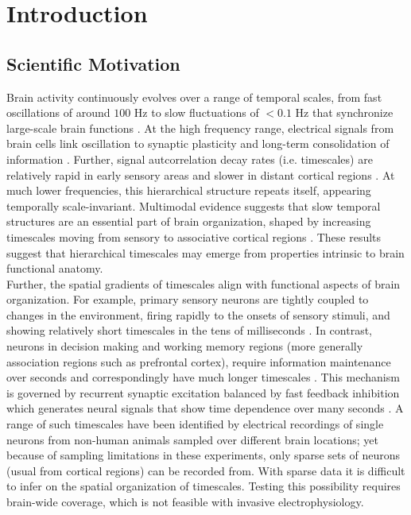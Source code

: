 \documentclass[latex/main.tex]{subfiles}
\begin{document}
\section{Introduction}

\subsection{Scientific Motivation} 

Brain activity continuously evolves over a range of temporal scales, from fast oscillations of around $100$ Hz to slow fluctuations of $<0.1$ Hz that synchronize large-scale brain functions \cite{buzsaki_neuronal_2004}. At the high frequency range, electrical signals from brain cells link oscillation to synaptic plasticity and long-term consolidation of information \cite{buzsaki_neuronal_2004}. Further, signal autcorrelation decay rates (i.e. timescales) are relatively rapid in early sensory areas and slower in distant cortical regions \cite{murray_hierarchy_2014, gao_neuronal_2020}. At much lower frequencies, this hierarchical structure repeats itself, appearing temporally scale-invariant. Multimodal evidence suggests that slow temporal structures are an essential part of brain organization, shaped by increasing timescales moving from sensory to associative cortical regions \cite{raut_hierarchical_2020, gao_neuronal_2020, hasson_hierarchy_2008}. These results suggest that hierarchical timescales may emerge from properties intrinsic to brain functional anatomy.\\

Further, the spatial gradients of timescales align with functional aspects of brain organization. For example, primary sensory neurons are tightly coupled to changes in the environment, firing rapidly to the onsets of sensory stimuli, and showing relatively short timescales in the tens of milliseconds \cite{runyan_distinct_2017}. In contrast, neurons in decision making and working memory regions (more generally association regions such as prefrontal cortex), require information maintenance over seconds and correspondingly have much longer timescales \cite{zylberberg_mechanisms_2017}. This mechanism is governed by recurrent synaptic excitation balanced by fast feedback inhibition which generates neural signals that show time dependence over many seconds \cite{wang_decision_2008}. A range of such timescales have been identified by electrical recordings of single neurons from non-human animals sampled over different brain locations; yet because of sampling limitations in these experiments, only sparse sets of neurons (usual from cortical regions) can be recorded from. With sparse data it is difficult to infer on the spatial organization of timescales. Testing this possibility requires brain-wide coverage, which is not feasible with invasive electrophysiology.\\
\end{document}
